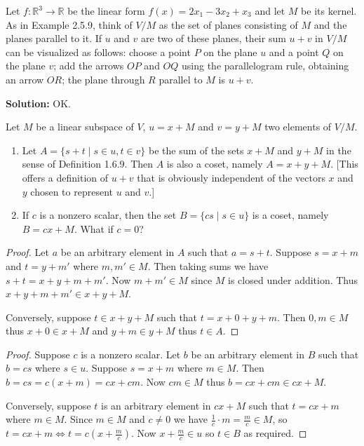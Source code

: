 \begin{tcolorbox}[title=Problem 3, breakable]
    Let $f : \mathbb{R}^3 \longrightarrow \mathbb{R}$
    be the linear form $f(x) = 2 x_1 - 3 x_2 + x_3$ and let $M$ be its 
    kernel. As in Example 2.5.9, think of $V/M$ as the set of planes consisting 
    of $M$ and the planes parallel to it. If $u$ and $v$ are two of these planes,
    their sum $u + v$ in $V/M$ can be visualized as follows: choose a point $P$
    on the plane $u$ and a point $Q$ on the plane $v$; add the arrows $OP$ and $OQ$
    using the parallelogram rule, obtaining an arrow $OR$; the plane through $R$ 
    parallel to $M$ is $u + v$.
\end{tcolorbox}

\textbf{Solution: } OK.


\begin{tcolorbox}[title=Problem 4, breakable]
    Let $M$ be a linear subspace of $V$, $u = x + M$ and $v = y + M$ 
    two elements of $V / M$.
    \begin{enumerate}
        \item Let $A = \{s + t \mid s \in u, t \in v\}$ be the sum of the sets $x + M$ and $y + M$
              in the sense of Definition 1.6.9. Then $A$ is also a coset, namely $A = x + y + M$.
              [This offers a definition of $u + v$ that is obviously independent of the vectors $x$ and $y$
              chosen to represent $u$ and $v$.]
        \item If $c$ is a nonzero scalar, then the set $B = \{cs \mid s \in u\}$ is a coset, 
              namely $B = cx + M$. What if $c = 0$?
    \end{enumerate}
\end{tcolorbox}

\begin{proof}
    Let $a$ be an arbitrary element in $A$ such that $a = s + t$.
    Suppose $s = x + m$ and $t = y + m'$ where $m, m' \in M$.
    Then taking sums we have $s + t = x + y + m + m'$.
    Now $m + m' \in M$ since $M$ is closed under addition.
    Thus $x + y + m + m' \in x + y + M$.

    Conversely, suppose $t \in x + y + M$ such that $t = x + 0 + y + m$.
    Then $0, m \in M$ thus $x + 0 \in x + M$ and $y + m \in y + M$ thus $t \in A$.
\end{proof}

\begin{proof}
    Suppose $c$ is a nonzero scalar.
    Let $b$ be an arbitrary element in $B$ such that $b = cs$ where $s \in u$.
    Suppose $s = x + m$ where $m \in M$. Then $b = cs = c(x + m) = cx + cm$.
    Now $cm \in M$ thus $b = cx + cm \in cx + M$.

    Conversely, suppose $t$ is an arbitrary element in $cx + M$ such that $t = cx + m$ where $m \in M$.
    Since $m \in M$ and $c \ne 0$ we have $\frac{1}{c} \cdot m =  \frac{m}{c} \in M$, so $t = cx + m \iff t = c(x + \frac{m}{c})$.
    Now $x + \frac{m}{c} \in u$ so $t \in B$ as required.
\end{proof}

